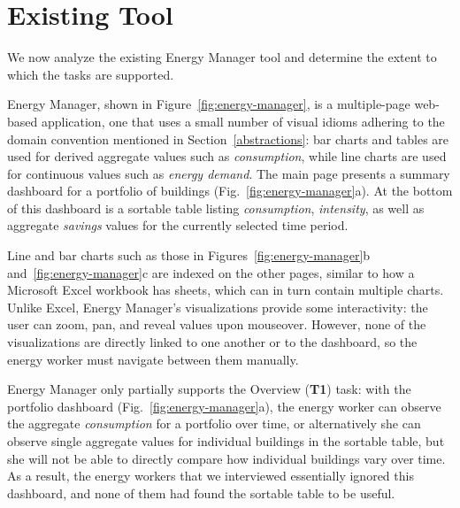 \documentclass[journal]{vgtc}                %
\newcommand{\bstart}[1]{\vspace{1mm} \noindent{\textbf{#1:}}}
\newcommand{\tm}[1]{\textcolor{red}{#1}}
\begin{document}

\section{Existing Tool}
\label{existing-tool}


We now analyze the existing Energy Manager tool and determine the extent to which the tasks are supported.


Energy Manager, shown in Figure~\ref{fig:energy-manager}, is a multiple-page web-based application, one that uses a small number of visual idioms adhering to the domain convention mentioned in Section~\ref{abstractions}: bar charts and tables are used for derived aggregate values such as {\it consumption}, while line charts are used for continuous values such as {\it energy demand}.
The main page presents a summary dashboard for a portfolio of buildings (Fig.~\ref{fig:energy-manager}a). 
At the bottom of this dashboard is a sortable table listing {\it consumption}, {\it intensity}, as well as aggregate {\it savings} values for the currently selected time period. 

Line and bar charts such as those in Figures~\ref{fig:energy-manager}b and~\ref{fig:energy-manager}c are indexed on the other pages, similar to how a Microsoft Excel workbook has sheets, which can in turn contain multiple charts. 
Unlike Excel, Energy Manager's visualizations provide some interactivity: the user can zoom, pan, and reveal values upon mouseover. 
However, none of the visualizations are directly linked to one another or to the dashboard, so the energy worker must navigate between them manually.

\bstart{Task support} Energy Manager only partially supports the Overview ({\bf T1}) task: with the portfolio dashboard (Fig.~\ref{fig:energy-manager}a), the energy worker can observe the aggregate {\it consumption} for a portfolio over time, or alternatively she can observe single aggregate values for individual buildings in the sortable table, but she will not be able to directly compare how individual buildings vary over time.
As a result, the energy workers that we interviewed essentially ignored this dashboard, and none of them had found the sortable table to be useful. 
\end{document}
